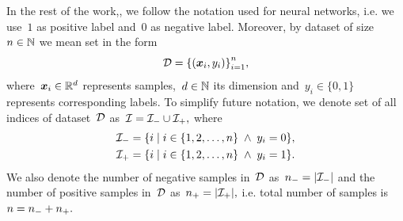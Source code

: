 \begin{notation}[Dataset]\label{not: dataset}
  In the rest of the work,, we follow the notation used for neural networks, i.e. we use~$1$ as positive label and~$0$ as negative label. Moreover, by dataset of size~$n \in \mathbb{N}$ we mean set in the form
  \begin{equation*}
    \D = \Brac[c]{(\bm{x}_i, y_i)}_{i=1}^{n},
  \end{equation*}
  where~$\bm{x}_i \in \mathbb{R}^d$ represents samples,~$d \in \mathbb{N}$ its dimension and~$y_i \in \{0, 1\}$ represents corresponding labels. To simplify future notation, we denote set of all indices of dataset~$\mathcal{D}$ as~$\mathcal{I} = \mathcal{I}_{-} \cup \mathcal{I}_{+},$ where
  \begin{equation*}
    \begin{aligned}
      \Ineg & = \Set{i}{i \in \{1, 2, \ldots, n\} \; \land \; y_i = 0}, \\
      \Ipos & = \Set{i}{i \in \{1, 2, \ldots, n\} \; \land \; y_i = 1}.
    \end{aligned}
  \end{equation*}
  We also denote the number of negative samples in~$\mathcal{D}$ as~$\nneg = \Brac[v]{\Ineg}$ and the number of positive samples in~$\mathcal{D}$ as~$\npos = \Brac[v]{\Ipos},$ i.e. total number of samples is~$n = n_{-} + n_{+}.$ 
\end{notation}

